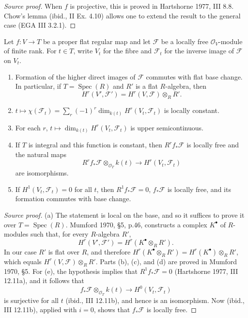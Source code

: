 \begin{proof}[Source proof]
When $f$ is projective, this is proved in Hartshorne 1977, III 8.8.  Chow's
lemma (ibid., II Ex. 4.10) allows one to extend the result to the general case
(EGA III 3.2.1).
\end{proof}

\begin{theorem}
\label{thm:milne-cohomology-base-change}

Let $f:V\to T$ be a proper flat regular map and let $\mathcal F$ be a locally
free $\mathcal O_V$-module of finite rank.  For $t\in T$, write $V_t$ for the
fibre and $\mathcal F_t$ for the inverse image of $\mathcal F$ on $V_t$.
\begin{enumerate}
\item Formation of the higher direct images of $\mathcal F$ commutes with flat
base change.  In particular, if $T=\operatorname{Spec}(R)$ and $R'$ is a
flat $R$-algebra, then
\[
 H^r(V',\mathcal F')=H^r(V,\mathcal F)\otimes_RR'.
\]
\item $t\mapsto\chi(\mathcal F_t)=\sum_r(-1)^r\dim_{k(t)}H^r(V_t,\mathcal F_t)$
is locally constant.
\item For each $r$, $t\mapsto\dim_{k(t)}H^r(V_t,\mathcal F_t)$ is upper
semicontinuous.
\item If $T$ is integral and this function is constant, then $R^rf_*\mathcal F$
is locally free and the natural maps
\[
 R^rf_*\mathcal F\otimes_{\mathcal O_T}k(t)\longrightarrow
 H^r(V_t,\mathcal F_t)
\]
are isomorphisms.
\item If $H^1(V_t,\mathcal F_t)=0$ for all $t$, then $R^1f_*\mathcal F=0$,
$f_*\mathcal F$ is locally free, and its formation commutes with base change.
\end{enumerate}
\end{theorem}

\begin{proof}[Source proof]
(a) The statement is local on the base, and so it suffices to prove it over
$T=\operatorname{Spec}(R)$.  Mumford 1970, \S5, p.46, constructs a complex
$K^\bullet$ of $R$-modules such that, for every $R$-algebra $R'$,
\[
H^r(V',\mathcal F')=H^r(K^\bullet\otimes_RR').
\]
In our case $R'$ is flat over $R$, and therefore
$H^r(K^\bullet\otimes_RR')=H^r(K^\bullet)\otimes_RR'$, which equals
$H^r(V,\mathcal F)\otimes_RR'$.  Parts (b), (c), and (d) are proved in
Mumford 1970, \S5.  For (e), the hypothesis implies that
$R^1f_*\mathcal F=0$ (Hartshorne 1977, III 12.11a), and it follows that
\[
f_*\mathcal F\otimes_{\mathcal O_T}k(t)\longrightarrow
H^0(V_t,\mathcal F_t)
\]
is surjective for all $t$ (ibid., III 12.11b), and hence is an isomorphism.
Now (ibid., III 12.11b), applied with $i=0$, shows that $f_*\mathcal F$ is
locally free.
\end{proof}

